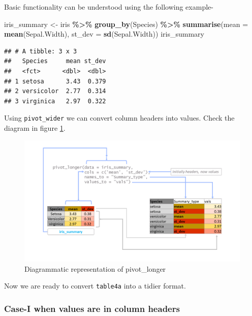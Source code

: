 \documentclass[
]{book}
\newenvironment{Shaded}{\begin{snugshade}}{\end{snugshade}}
\newcommand{\AttributeTok}[1]{\textcolor[rgb]{0.13,0.29,0.53}{#1}}
\newcommand{\FunctionTok}[1]{\textcolor[rgb]{0.13,0.29,0.53}{\textbf{#1}}}
\newcommand{\NormalTok}[1]{#1}
\newcommand{\OtherTok}[1]{\textcolor[rgb]{0.56,0.35,0.01}{#1}}
\newcommand{\SpecialCharTok}[1]{\textcolor[rgb]{0.81,0.36,0.00}{\textbf{#1}}}
\begin{document}
Basic functionality can be understood using the following example-

\begin{Shaded}
\begin{Highlighting}[]
\NormalTok{iris\_summary }\OtherTok{\textless{}{-}}\NormalTok{ iris }\SpecialCharTok{\%\textgreater{}\%} 
  \FunctionTok{group\_by}\NormalTok{(Species) }\SpecialCharTok{\%\textgreater{}\%} 
  \FunctionTok{summarise}\NormalTok{(}\AttributeTok{mean =} \FunctionTok{mean}\NormalTok{(Sepal.Width),}
            \AttributeTok{st\_dev =} \FunctionTok{sd}\NormalTok{(Sepal.Width))}
\NormalTok{iris\_summary}
\end{Highlighting}
\end{Shaded}

\begin{verbatim}
## # A tibble: 3 x 3
##   Species     mean st_dev
##   <fct>      <dbl>  <dbl>
## 1 setosa      3.43  0.379
## 2 versicolor  2.77  0.314
## 3 virginica   2.97  0.322
\end{verbatim}

Using \texttt{pivot\_wider} we can convert column headers into values. Check the diagram in figure \ref{fig:plong}.

\begin{figure}

{\centering \includegraphics[width=0.99\linewidth]{images/pivot_longer} 

}

\caption{Diagrammatic representation of pivot\_longer}\label{fig:plong}
\end{figure}

Now we are ready to convert \texttt{table4a} into a tidier format.

\hypertarget{case-i-when-values-are-in-column-headers}{%
\subsubsection*{Case-I when values are in column headers}\label{case-i-when-values-are-in-column-headers}}
\end{document}
